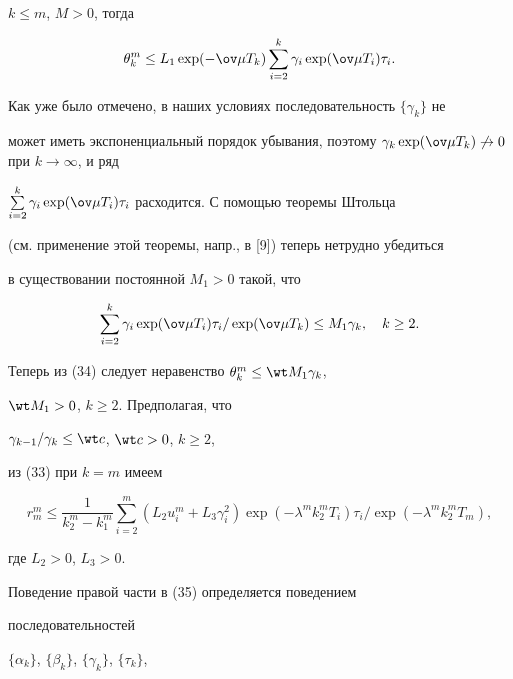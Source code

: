 $k\leq m$, $M>0$, тогда


\begin{equation}\label {34}


\theta_k^m \leq L_1\exp(-\ov \mu T_k)\sum_{i=2}^k\gamma_i


\exp(\ov \mu T_i)\tau_i.


\end{equation}


Как уже было отмечено, в наших условиях последовательность $\{\gamma_k\}$ не


может иметь экспоненциальный порядок убывания, поэтому $\gamma_k\exp(


\ov\mu T_k)\not\rightarrow 0$ при $k\rightarrow \infty $, и ряд


$\sum\limits_{i=2}^k


\gamma_i\exp(\ov \mu T_i)\tau_i$ расходится. С помощью теоремы Штольца


(см. применение этой теоремы, напр., в [9]) теперь нетрудно убедиться


в существовании постоянной $M_1>0$ такой, что


$$


\sum_{i=2}^k\gamma_i\exp(\ov \mu T_i)\tau_i/\exp(\ov \mu T_k)\leq


M_1\gamma_k,\quad k\geq 2.


$$


Теперь из (34) следует неравенство $\theta_k^m \leq \wt M_1\gamma_k$,


$\wt M_1 >0$, $k\geq 2$. Предполагая, что


$\gamma_{k-1}/\gamma_k \leq \wt c$, $\wt c>0$, $k\geq 2$,


из (33) при $k=m$ имеем


\begin{equation}\label {35}


r_m^m \leq \frac{1}{k_2^m-k_1^m}


\sum_{i=2}^m(L_2u_i^m+L_3\gamma_i^2)\exp(-\lambda^mk_2^mT_i)\tau_i/\exp


(-\lambda^mk_2^mT_m),


\end{equation}


где $L_2>0$, $L_3>0$.





Поведение правой части в (35) определяется поведением


последовательностей


$\{\alpha_k\}$, $\{\beta_k\}$, $\{\gamma_k\}$, $\{\tau_k\}$,


